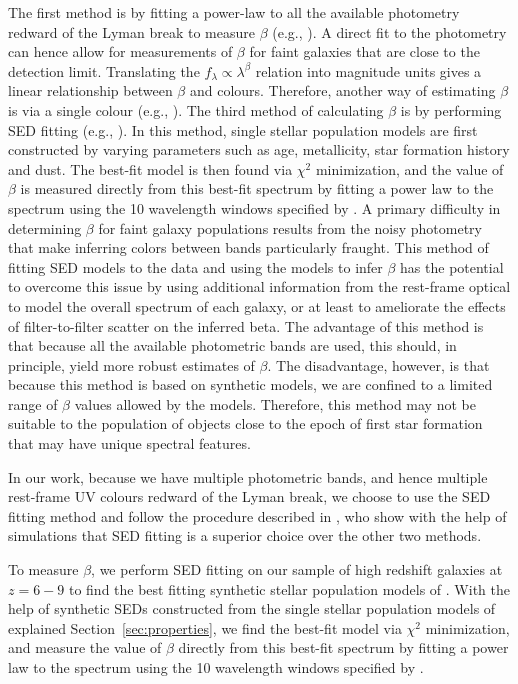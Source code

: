 \documentclass[twocolumn]{aastex63}
\begin{document}
The first method is by fitting a power-law to all the available photometry redward of the Lyman break to measure $\beta$ (e.g., \citealt{Bouwens2014b}). A direct fit to the photometry can hence allow for measurements of $\beta$ for faint galaxies that are close to the detection limit. Translating the $f_{\lambda}\propto\lambda^{\beta}$ relation into magnitude units gives a linear relationship between $\beta$ and colours. Therefore, another way of estimating $\beta$ is via a single colour (e.g., \citealt{Dunlop2012, Hathi2008}). The third method of calculating  $\beta$ is by performing SED fitting (e.g., \citealt{Finkelstein2012}). In this method, single stellar population models are first constructed by varying parameters such as age, metallicity, star formation history and dust. The best-fit model is then found via  $\chi^{2}$ minimization, and the value of $\beta$ is measured directly from this best-fit spectrum by fitting a power law to the spectrum using the 10 wavelength windows specified by \citet{Calzetti1994}. A primary difficulty in determining $\beta$ for faint galaxy populations results from the noisy photometry that make inferring colors between bands particularly fraught. This method of fitting SED models to the data and using the models to infer $\beta$ has the potential to overcome this issue by using additional information from the rest-frame optical to model the overall spectrum of each galaxy, or at least to ameliorate the effects of filter-to-filter scatter on the inferred beta. The advantage of this method is that because all the available photometric bands are used, this should, in principle, yield more robust estimates of $\beta$. The disadvantage, however, is that because this method is based on synthetic models, we are confined to a limited range of $\beta$ values allowed by the models. Therefore, this method may not be suitable to the population of objects close to the epoch of first star formation that may have unique spectral features. 

In our work, because we have multiple photometric bands, and hence multiple rest-frame UV colours redward of the Lyman break, we choose to use the SED fitting method and follow the procedure described in \citet{Finkelstein2012}, who show with the help of simulations that SED fitting is a superior choice over the other two methods. 

To measure $\beta$, we perform SED fitting on our sample of high redshift galaxies at $z=6-9$ to find the best fitting synthetic stellar population models of \citet{Bruzual2003}.  With the help of synthetic SEDs constructed from the single stellar population models of \citet{Bruzual2003} explained Section~\ref{sec:properties}, we find the best-fit model via $\chi^{2}$ minimization, and measure the value of $\beta$ directly from this best-fit spectrum by fitting a power law to the spectrum using the 10 wavelength windows specified by \citet{Calzetti1994}. 
\end{document}
